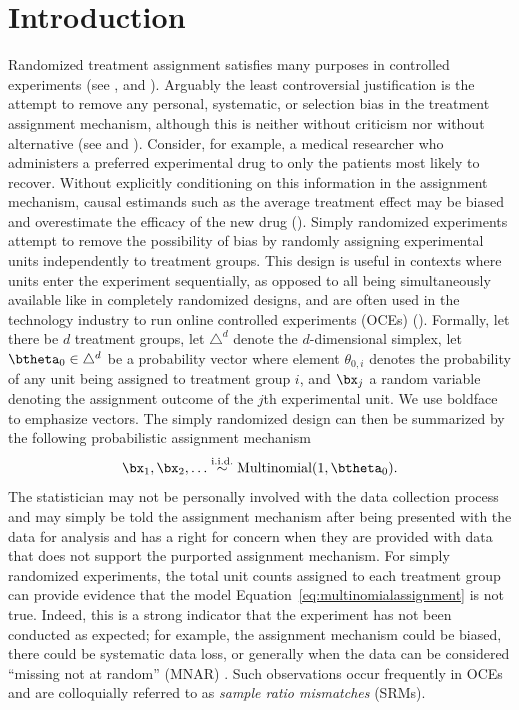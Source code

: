 \documentclass[11pt]{article}
\begin{document}
\section{Introduction}
\label{sec:intro}
Randomized treatment assignment satisfies many purposes in controlled experiments (see \cite{kempthorne}, \cite{cox} and \cite{rubin}).
Arguably the least controversial justification is the attempt to remove any personal, systematic, or selection bias in the treatment assignment mechanism, although this is neither without criticism nor without alternative (see \cite{lindley} and \cite{kadane}).
Consider, for example, a medical researcher who administers a preferred experimental drug to only the patients most likely to recover.
Without explicitly conditioning on this information in the assignment mechanism, causal estimands such as the average treatment effect may be biased and overestimate the efficacy of the new drug (\cite{berry}).
Simply randomized experiments attempt to remove the possibility of bias by randomly assigning experimental units independently to treatment groups.
This design is useful in contexts where units enter the experiment sequentially, as opposed to all being simultaneously available like in completely randomized designs, and are often used in the technology industry to run online controlled experiments (OCEs) (\cite{oce}).
Formally, let there be $d$ treatment groups, let $\triangle^d$ denote the $d$-dimensional simplex, let $\btheta_0 \in \triangle^d$ be a probability vector where element $\theta_{0,i}$ denotes the probability of any unit being assigned to treatment group $i$, and $\bx_j$ a random variable denoting the assignment outcome of the $j$th experimental unit.
We use boldface to emphasize vectors.
The simply randomized design can then be summarized by the following probabilistic assignment mechanism
\begin{equation}
  \label{eq:multinomialassignment}
  \bx_1,\bx_2, \dots \stackrel{\text{i.i.d.}}{\sim} \text{Multinomial}(1,\btheta_0).
\end{equation}
The statistician may not be personally involved with the data collection process and may simply be told the assignment mechanism after being presented with the data for analysis and 
has a right for concern when they are provided with data that does not support the purported assignment mechanism.
For simply randomized experiments, the total unit counts assigned to each treatment group can provide evidence that the model Equation~\ref{eq:multinomialassignment} is not true.
Indeed, this is a strong indicator that the experiment has not been conducted as expected; for example, the assignment mechanism could be biased, there could be systematic data loss, or generally when the data can be considered ``missing not at random'' (MNAR) \citep{missing-data}.
Such observations occur frequently in OCEs and are colloquially referred to as \textit{sample ratio mismatches} (SRMs).
\end{document}
